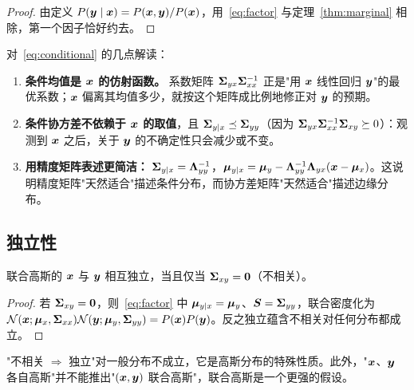 \begin{proof}
由定义 $P(\bm{y}\mid\bm{x})=P(\bm{x},\bm{y})/P(\bm{x})$，用~\eqref{eq:factor} 与定理~\ref{thm:marginal} 相除，第一个因子恰好约去。
\end{proof}

对~\eqref{eq:conditional} 的几点解读：
\begin{enumerate}[nosep]
  \item \textbf{条件均值是 $\bm{x}$ 的仿射函数。} 系数矩阵 $\bm{\Sigma}_{yx}\bm{\Sigma}_{xx}^{-1}$ 正是"用 $\bm{x}$ 线性回归 $\bm{y}$"的最优系数；$\bm{x}$ 偏离其均值多少，就按这个矩阵成比例地修正对 $\bm{y}$ 的预期。
  \item \textbf{条件协方差不依赖于 $\bm{x}$ 的取值}，且 $\bm{\Sigma}_{y|x}\preceq\bm{\Sigma}_{yy}$（因为 $\bm{\Sigma}_{yx}\bm{\Sigma}_{xx}^{-1}\bm{\Sigma}_{xy}\succeq 0$）：观测到 $\bm{x}$ 之后，关于 $\bm{y}$ 的不确定性只会减少或不变。
  \item \textbf{用精度矩阵表述更简洁：} $\bm{\Sigma}_{y|x}=\bm{\Lambda}_{yy}^{-1}$，$\bm{\mu}_{y|x}=\bm{\mu}_y-\bm{\Lambda}_{yy}^{-1}\bm{\Lambda}_{yx}(\bm{x}-\bm{\mu}_x)$。这说明精度矩阵"天然适合"描述条件分布，而协方差矩阵"天然适合"描述边缘分布。
\end{enumerate}

\subsection{独立性}

\begin{corollary}
联合高斯的 $\bm{x}$ 与 $\bm{y}$ 相互独立，当且仅当 $\bm{\Sigma}_{xy}=\bm{0}$（不相关）。
\end{corollary}

\begin{proof}
若 $\bm{\Sigma}_{xy}=\bm{0}$，则~\eqref{eq:factor} 中 $\bm{\mu}_{y|x}=\bm{\mu}_y$、$\bm{S}=\bm{\Sigma}_{yy}$，联合密度化为 $\mathcal{N}(\bm{x};\bm{\mu}_x,\bm{\Sigma}_{xx})\mathcal{N}(\bm{y};\bm{\mu}_y,\bm{\Sigma}_{yy})=P(\bm{x})P(\bm{y})$。反之独立蕴含不相关对任何分布都成立。
\end{proof}

\begin{remark}
"不相关 $\Rightarrow$ 独立"对一般分布不成立，它是高斯分布的特殊性质。此外，"$\bm{x}$、$\bm{y}$ 各自高斯"并不能推出"$(\bm{x},\bm{y})$ 联合高斯"，联合高斯是一个更强的假设。
\end{remark}

